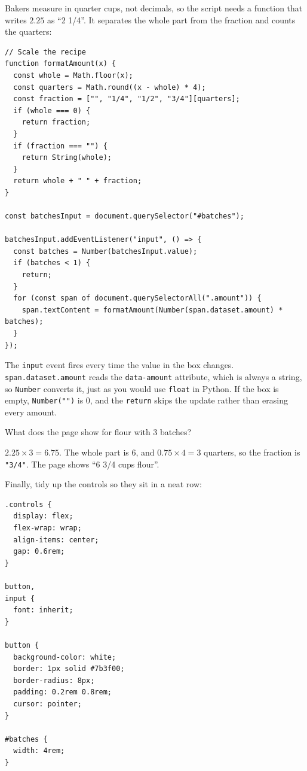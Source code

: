 Bakers measure in quarter cups, not decimals, so the script needs a function that writes $2.25$ as
``2 1/4''. It separates the whole part from the fraction and counts the quarters:

\begin{verbatim}
// Scale the recipe
function formatAmount(x) {
  const whole = Math.floor(x);
  const quarters = Math.round((x - whole) * 4);
  const fraction = ["", "1/4", "1/2", "3/4"][quarters];
  if (whole === 0) {
    return fraction;
  }
  if (fraction === "") {
    return String(whole);
  }
  return whole + " " + fraction;
}

const batchesInput = document.querySelector("#batches");

batchesInput.addEventListener("input", () => {
  const batches = Number(batchesInput.value);
  if (batches < 1) {
    return;
  }
  for (const span of document.querySelectorAll(".amount")) {
    span.textContent = formatAmount(Number(span.dataset.amount) * batches);
  }
});
\end{verbatim}

The \verb|input| event fires every time the value in the box changes. \verb|span.dataset.amount| reads the
\verb|data-amount| attribute, which is always a string, so \verb|Number| converts it, just as you would use
\verb|float| in Python. If the box is empty, \verb|Number("")| is 0, and the \verb|return| skips the update
rather than erasing every amount.

\begin{Worked}
\begin{Problem}
What does the page show for flour with 3 batches?
\end{Problem}
\begin{Solution}
$2.25 \times 3 = 6.75$. The whole part is 6, and $0.75 \times 4 = 3$ quarters, so the
fraction is \verb|"3/4"|. The page shows ``6 3/4 cups flour''.
\end{Solution}
\end{Worked}

Finally, tidy up the controls so they sit in a neat row:

\begin{verbatim}
.controls {
  display: flex;
  flex-wrap: wrap;
  align-items: center;
  gap: 0.6rem;
}

button,
input {
  font: inherit;
}

button {
  background-color: white;
  border: 1px solid #7b3f00;
  border-radius: 8px;
  padding: 0.2rem 0.8rem;
  cursor: pointer;
}

#batches {
  width: 4rem;
}
\end{verbatim}

